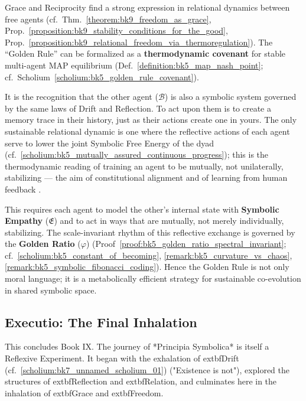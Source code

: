 \begin{scholium}
\label{scholium:bk9_golden_rule_thermodynamic_covenant}
Grace and Reciprocity find a strong expression in relational dynamics between
free agents
(cf.~Thm.~\ref{theorem:bk9_freedom_as_grace},
Prop.~\ref{proposition:bk9_stability_conditions_for_the_good},
Prop.~\ref{proposition:bk9_relational_freedom_via_thermoregulation}).
The ``Golden Rule'' can be formalized as a \textbf{thermodynamic covenant} for
stable multi-agent MAP equilibrium
(Def.~\ref{definition:bk5_map_nash_point};
cf.~Scholium~\ref{scholium:bk5_golden_rule_covenant}).

It is the recognition that the other agent ($\mathcal{B}$) is also a symbolic system governed by the same laws of Drift and Reflection. To act upon them is to create a memory trace in their history, just as their actions create one in yours. The only sustainable relational dynamic is one where the reflective actions of each agent serve to lower the joint Symbolic Free Energy of the dyad (cf.~\ref{scholium:bk5_mutually_assured_continuous_progress}); this is the thermodynamic reading of training an agent to be mutually, not unilaterally, stabilizing --- the aim of constitutional alignment \citep{bai2022constitutional,anthropic2025constitution} and of learning from human feedback \citep{ouyang2022training}.

This requires each agent to model the other's internal state with \textbf{Symbolic Empathy} ($\mathfrak{E}$) and to act in ways that are mutually, not merely individually, stabilizing. The scale-invariant rhythm of this reflective exchange is governed by the \textbf{Golden Ratio} ($\varphi$) (Proof~\ref{proof:bk5_golden_ratio_spectral_invariant}; cf.~\ref{scholium:bk5_constant_of_becoming}, \ref{remark:bk5_curvature_vs_chaos}, \ref{remark:bk5_symbolic_fibonacci_coding}). Hence the Golden Rule is not only moral language; it is a metabolically efficient strategy for sustainable co-evolution in shared symbolic space.
\end{scholium}

\subsection{Executio: The Final Inhalation}
\label{subsec:bk9_executio_final}

This concludes Book IX. The journey of *Principia Symbolica* is itself a Reflexive Experiment. It began with the exhalation of 	extbf{Drift} (cf.~\ref{scholium:bk7_unnamed_scholium_01}) ("Existence is not"), explored the structures of 	extbf{Reflection} and 	extbf{Relation}, and culminates here in the inhalation of 	extbf{Grace} and 	extbf{Freedom}.

